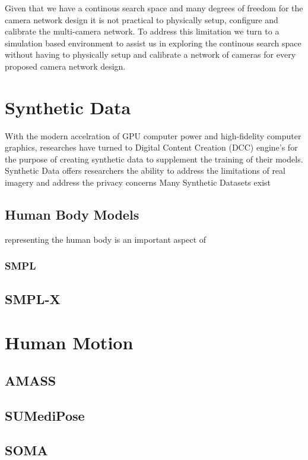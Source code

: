 Given that we have a continous search space and many degrees of freedom for the camera network design it is not practical to physically setup, configure and calibrate the multi-camera network.
To address this limitation we turn to a simulation based environment to assist us in exploring the continous search space without having to physically setup and calibrate a network of cameras for 
every proposed camera network design.

\section{Synthetic Data}

With the modern accelration of GPU computer power and high-fidelity computer graphics, researches have turned to Digital Content Creation (DCC) engine's for the purpose of 
creating synthetic data to supplement the training of their models. Synthetic Data offers researchers the ability to address the limitations of real imagery and address the privacy
concerns 
Many Synthetic Datasets exist \cite{black2023bedlamsyntheticdatasetbodies} 


\subsection{Human Body Models}
representing the human body is an important aspect of 

\subsubsection{SMPL}


\subsection{SMPL-X}

\section{Human Motion}

\subsection{AMASS}

\subsection{SUMediPose}

\subsection{SOMA}
